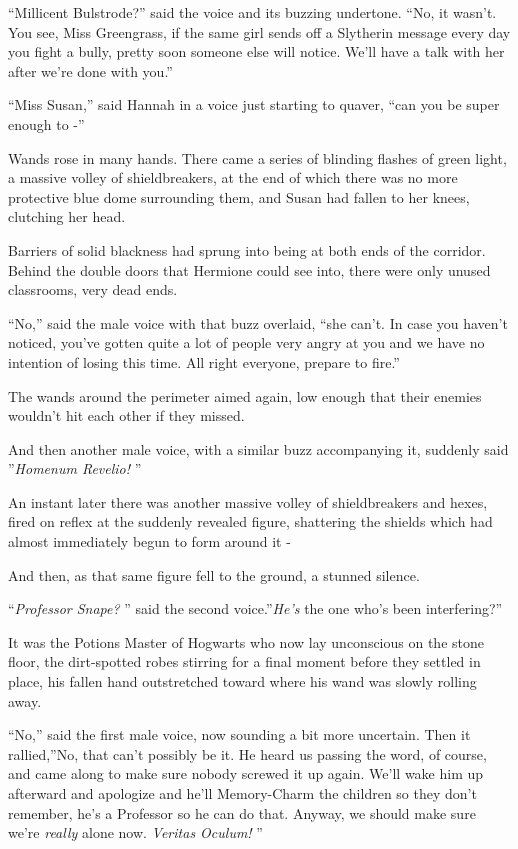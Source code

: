 ``Millicent Bulstrode?'' said the voice and its buzzing undertone. ``No,
it wasn't. You see, Miss Greengrass, if the same girl sends off a
Slytherin message every day you fight a bully, pretty soon someone else
will notice. We'll have a talk with her after we're done with you.''

``Miss Susan,'' said Hannah in a voice just starting to quaver, ``can
you be super enough to -''

Wands rose in many hands. There came a series of blinding flashes of
green light, a massive volley of shieldbreakers, at the end of which
there was no more protective blue dome surrounding them, and Susan had
fallen to her knees, clutching her head.

Barriers of solid blackness had sprung into being at both ends of the
corridor. Behind the double doors that Hermione could see into, there
were only unused classrooms, very dead ends.

``No,'' said the male voice with that buzz overlaid, ``she can't. In
case you haven't noticed, you've gotten quite a lot of people very angry
at you and we have no intention of losing this time. All right everyone,
prepare to fire.''

The wands around the perimeter aimed again, low enough that their
enemies wouldn't hit each other if they missed.

And then another male voice, with a similar buzz accompanying it,
suddenly said ''\emph{Homenum Revelio!} ''

An instant later there was another massive volley of shieldbreakers and
hexes, fired on reflex at the suddenly revealed figure, shattering the
shields which had almost immediately begun to form around it -

And then, as that same figure fell to the ground, a stunned silence.

``\emph{Professor Snape?} '' said the second voice.''\emph{He's} the one
who's been interfering?''

It was the Potions Master of Hogwarts who now lay unconscious on the
stone floor, the dirt-spotted robes stirring for a final moment before
they settled in place, his fallen hand outstretched toward where his
wand was slowly rolling away.

``No,'' said the first male voice, now sounding a bit more uncertain.
Then it rallied,''No, that can't possibly be it. He heard us passing the
word, of course, and came along to make sure nobody screwed it up again.
We'll wake him up afterward and apologize and he'll Memory-Charm the
children so they don't remember, he's a Professor so he can do that.
Anyway, we should make sure we're \emph{really} alone now. \emph{Veritas
Oculum!} ''

